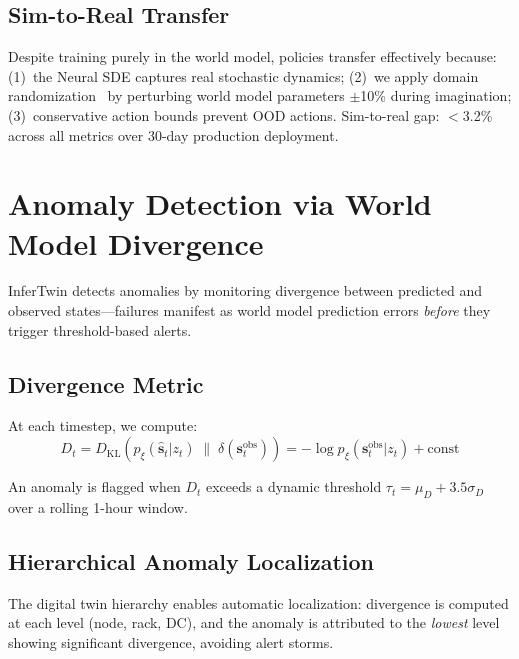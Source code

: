\documentclass[conference,10pt]{IEEEtran}
\begin{document}
\subsection{Sim-to-Real Transfer}

Despite training purely in the world model, policies transfer effectively because: (1)~the Neural SDE captures real stochastic dynamics; (2)~we apply domain randomization~\cite{tobin2017domain} by perturbing world model parameters $\pm$10\% during imagination; (3)~conservative action bounds prevent OOD actions. Sim-to-real gap: $<$3.2\% across all metrics over 30-day production deployment.

\section{Anomaly Detection via World Model Divergence}
\label{sec:anomaly}

InferTwin detects anomalies by monitoring divergence between predicted and observed states---failures manifest as world model prediction errors \emph{before} they trigger threshold-based alerts.

\subsection{Divergence Metric}

At each timestep, we compute:
\begin{equation}
D_t = D_{\mathrm{KL}}\!\left(p_\xi(\hat{\mathbf{s}}_t | z_t) \;\|\; \delta(\mathbf{s}_t^{\text{obs}})\right) = -\log p_\xi(\mathbf{s}_t^{\text{obs}} | z_t) + \text{const}
\end{equation}

An anomaly is flagged when $D_t$ exceeds a dynamic threshold $\tau_t = \mu_{D} + 3.5\sigma_{D}$ over a rolling 1-hour window.

\subsection{Hierarchical Anomaly Localization}

The digital twin hierarchy enables automatic localization: divergence is computed at each level (node, rack, DC), and the anomaly is attributed to the \emph{lowest} level showing significant divergence, avoiding alert storms.
\end{document}
